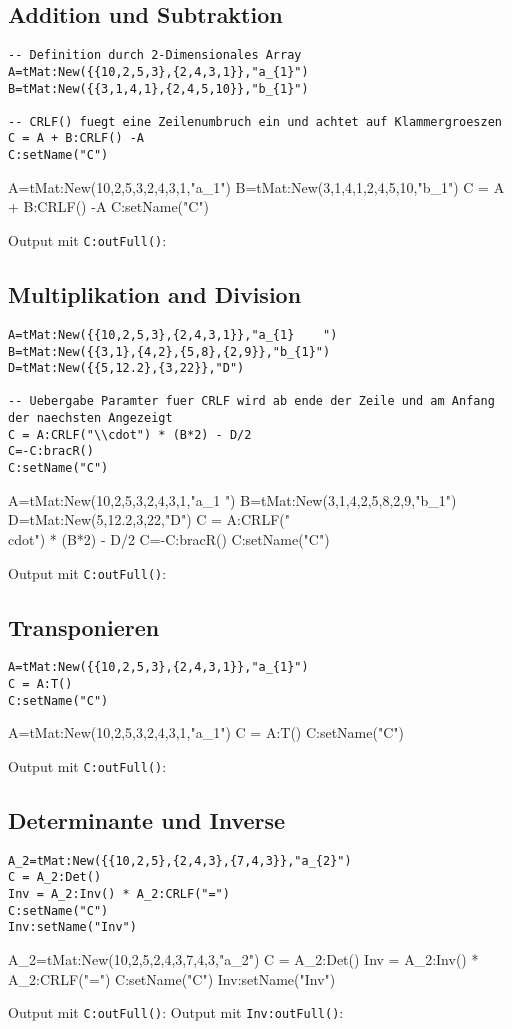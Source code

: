 \subsection{Addition und Subtraktion}
\begin{lstlisting}
-- Definition durch 2-Dimensionales Array
A=tMat:New({{10,2,5,3},{2,4,3,1}},"a_{1}")
B=tMat:New({{3,1,4,1},{2,4,5,10}},"b_{1}")

-- CRLF() fuegt eine Zeilenumbruch ein und achtet auf Klammergroeszen
C = A + B:CRLF() -A
C:setName("C")
\end{lstlisting}
\begin{luacode*}
A=tMat:New({{10,2,5,3},{2,4,3,1}},"a_{1}")
B=tMat:New({{3,1,4,1},{2,4,5,10}},"b_{1}")
C = A + B:CRLF() -A
C:setName("C")
\end{luacode*}
Output mit \lstinline{C:outFull()}:
\subsection{Multiplikation and Division}
\begin{lstlisting}
A=tMat:New({{10,2,5,3},{2,4,3,1}},"a_{1}	")
B=tMat:New({{3,1},{4,2},{5,8},{2,9}},"b_{1}")
D=tMat:New({{5,12.2},{3,22}},"D")

-- Uebergabe Paramter fuer CRLF wird ab ende der Zeile und am Anfang der naechsten Angezeigt
C = A:CRLF("\\cdot") * (B*2) - D/2
C=-C:bracR()
C:setName("C")
\end{lstlisting}
\begin{luacode*}
A=tMat:New({{10,2,5,3},{2,4,3,1}},"a_{1}	")
B=tMat:New({{3,1},{4,2},{5,8},{2,9}},"b_{1}")
D=tMat:New({{5,12.2},{3,22}},"D")
C = A:CRLF("\\cdot") * (B*2) - D/2
C=-C:bracR()
C:setName("C")
\end{luacode*}
Output mit \lstinline{C:outFull()}:
\subsection{Transponieren}
\begin{lstlisting}
A=tMat:New({{10,2,5,3},{2,4,3,1}},"a_{1}")
C = A:T()
C:setName("C")
\end{lstlisting}
\begin{luacode*}
A=tMat:New({{10,2,5,3},{2,4,3,1}},"a_{1}")
C = A:T()
C:setName("C")
\end{luacode*}
Output mit \lstinline{C:outFull()}:
\subsection{Determinante und Inverse}
\begin{lstlisting}
A_2=tMat:New({{10,2,5},{2,4,3},{7,4,3}},"a_{2}")
C = A_2:Det()
Inv = A_2:Inv() * A_2:CRLF("=")
C:setName("C")
Inv:setName("Inv")
\end{lstlisting}
\begin{luacode*}
A_2=tMat:New({{10,2,5},{2,4,3},{7,4,3}},"a_{2}")
C = A_2:Det()
Inv = A_2:Inv() * A_2:CRLF("=")
C:setName("C")
Inv:setName("Inv")
\end{luacode*}
Output mit \lstinline{C:outFull()}:
Output mit \lstinline{Inv:outFull()}:
